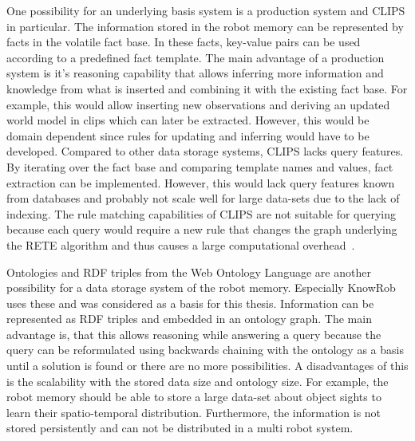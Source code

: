 One possibility for an underlying basis system is a production system
and CLIPS in particular. The information stored in the robot memory
can be represented by facts in the volatile fact base. In these facts,
key-value pairs can be used according to a predefined fact
template. The main advantage of a production system is it's reasoning
capability that allows inferring more information and knowledge from
what is inserted and combining it with the existing fact base. For
example, this would allow inserting new observations and deriving an
updated world model in clips which can later be extracted. However,
this would be domain dependent since rules for updating and inferring
would have to be developed. Compared to other data storage systems,
CLIPS lacks query features. By iterating over the fact base and
comparing template names and values, fact extraction can be
implemented. However, this would lack query features known from
databases and probably not scale well for large data-sets due to the
lack of indexing. The rule matching capabilities of CLIPS are not
suitable for querying because each query would require a new rule that
changes the graph underlying the RETE algorithm and thus causes a
large computational overhead~\cite{Rete}.

Ontologies and RDF triples from the Web Ontology Language are another
possibility for a data storage system of the robot memory. Especially
KnowRob uses these and was considered as a basis for this
thesis. Information can be represented as RDF triples and embedded in
an ontology graph. The main advantage is, that this allows reasoning
while answering a query because the query can be reformulated using
backwards chaining with the ontology as a basis until a solution is
found or there are no more possibilities. A disadvantages of this is
the scalability with the stored data size and ontology size. For
example, the robot memory should be able to store a large data-set
about object sights to learn their spatio-temporal
distribution. Furthermore, the information is not stored persistently
and can not be distributed in a multi robot system.

